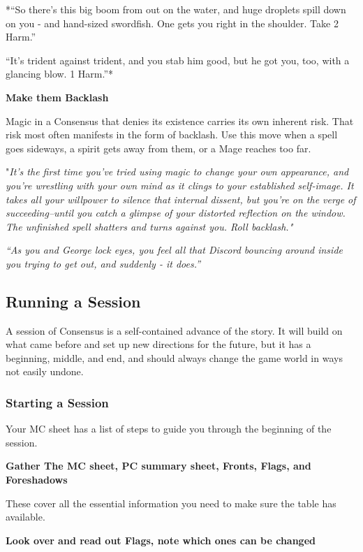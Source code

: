 \documentclass[
]{article}
\begin{document}
*``So there's this big boom from out on the water, and huge droplets
spill down on you - and hand-sized swordfish. One gets you right in the
shoulder. Take 2 Harm.''

``It's trident against trident, and you stab him good, but he got you,
too, with a glancing blow. 1 Harm.''*

\textbf{Make them Backlash}

Magic in a Consensus that denies its existence carries its own inherent
risk. That risk most often manifests in the form of backlash. Use this
move when a spell goes sideways, a spirit gets away from them, or a Mage
reaches too far.

"\emph{It's the first time you've tried using magic to change your own
appearance, and you're wrestling with your own mind as it clings to your
established self-image. It takes all your willpower to silence that
internal dissent, but you're on the verge of succeeding--until you catch
a glimpse of your distorted reflection on the window. The unfinished
spell shatters and turns against you. Roll backlash."}

\emph{``As you and George lock eyes, you feel all that Discord bouncing
around inside you trying to get out, and suddenly - it does.''}

\hypertarget{running-a-session}{%
\subsection{Running a Session}\label{running-a-session}}

A session of Consensus is a self-contained advance of the story. It will
build on what came before and set up new directions for the future, but
it has a beginning, middle, and end, and should always change the game
world in ways not easily undone.

\hypertarget{starting-a-session}{%
\subsubsection{Starting a Session}\label{starting-a-session}}

Your MC sheet has a list of steps to guide you through the beginning of
the session.

\textbf{Gather The MC sheet, PC summary sheet, Fronts, Flags, and
Foreshadows}

These cover all the essential information you need to make sure the
table has available.

\textbf{Look over and read out Flags, note which ones can be changed}
\end{document}
